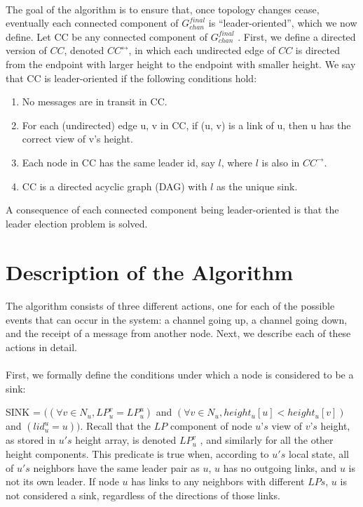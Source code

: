 \paragraph{}The goal of the algorithm is to ensure that, once topology changes cease, eventually each connected component of $G_{chan} ^{final}$ is “leader-oriented”, which we now define. Let CC be any connected component of $G_{chan} ^{final}$ . First, we define a directed version of $CC$, denoted $CC^{\longleftrightarrow}$, in which each undirected edge of $CC$ is directed from the endpoint with larger height to the endpoint with smaller height. We say that CC is leader-oriented if the following conditions hold:
\begin{enumerate}
	\item No messages are in transit in CC.
	\item For each (undirected) edge {u, v} in CC, if (u, v) is a link of u, then u has the correct view of v’s height.
	\item  Each node in CC has the same leader id, say $l$, where $l$ is also in $CC^{\longrightarrow}$. 
	\item  CC is a directed acyclic graph (DAG) with $l$ as the unique sink.
\end{enumerate}
A consequence of each connected component being leader-oriented is that the leader election problem is solved.
\section{Description of the Algorithm}
\paragraph{}The algorithm consists of three different actions, one for each of the possible events that can occur in the system: a channel going up, a channel going down, and the receipt of a message from another node. Next, we describe each of these actions in detail.
\paragraph{}First, we formally define the conditions under which a node is considered to be a sink:
\begin{list}{--}{spacing}
	\item SINK = $((\forall v \in N_u, LP_u ^v = LP_u ^u )$ and $(\forall v \in N_u, height_u[u] < height_u[v])$ and $(lid_u ^u = u))$. Recall that the $LP$ component of node $u’s$ view of $v’s$ height, as stored in $u's$ height array, is denoted $LP_u ^v$ , and similarly for all the other height components. This predicate is true when, according to $u's$ local state, all of $u's$ neighbors have the same leader pair as $u$, $u$ has no outgoing links, and $u$ is not its own leader. If node $u$ has links to any neighbors with different $LPs$, $u$ is not considered a sink, regardless of the directions of those links.
\end{list}
